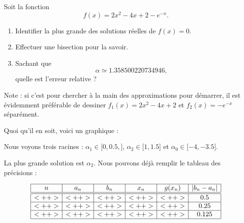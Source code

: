\begin{example}

    Soit la fonction 
    \begin{equation}
        f(x)=2x^2-4x+2-e^{-x}.
    \end{equation}

    \begin{enumerate}
        \item
            Identifier la plus grande des solutions réelles de \( f(x)=0\).
        \item
            Effectuer une bisection pour la savoir.
        \item
            Sachant que
            \begin{equation}
                \alpha\simeq 1.358500220734946,
            \end{equation}
            quelle est l'erreur relative ?
    \end{enumerate}

    Note : si c'est pour chercher à la main des approximations pour démarrer, il est évidemment préférable de dessiner \( f_1(x)=2x^2-4x+2\) et \( f_2(x)=- e^{-x}\) séparément.

    Quoi qu'il en soit, voici un graphique :

\begin{center}
   
\end{center}

    Nous voyons trois racines : \( \alpha_1\in\mathopen[ 0,0.5 ,  \mathclose]\), \( \alpha_2\in\mathopen[ 1, 1.5 \mathclose]\) et \( \alpha_0\in\mathopen[ -4 , -3.5 \mathclose]\).

    La plus grande solution est \( \alpha_2\). Nous pouvons déjà remplir le tableau des précisions :

    \begin{equation*}
        \begin{array}[]{|c|c|c|c|c|c|}
            \hline
            n&a_n&b_n&x_n&g(x_n)&| b_n-a_n |\\
            \hline\hline
            <++>&<++>&<++>&<++>&<++>&0.5\\
            \hline
            <++>&<++>&<++>&<++>&<++>&0.25\\
            \hline
            <++>&<++>&<++>&<++>&<++>&0.125\\
            \hline
        \end{array}
    \end{equation*}


\end{example}
